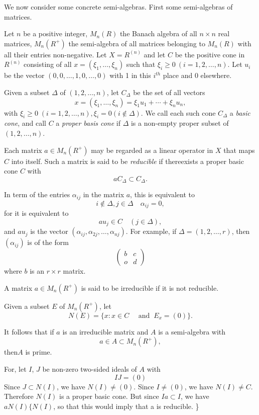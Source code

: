 We now consider some concrete semi-algebras. First some semi-algebras
of matrices. 

Let $n$ be a positive integer, $M_n (R)$ the Banach algebra of all $n
\times n$ real matrices, $M_n(R^+)$ the semi-algebra of all matrices
belonging to $M_n(R)$ with all their entries non-negative. Let $X =
R^{(n)}$ and let $C$ be the positive cone in $R^{(n)}$ consisting of
all $x = ( \xi_1 , \ldots, \xi_n)$ such that $\xi_i \geq 0~ (i = 1, 2,
\ldots, n)$. Let $u_i$ be the vector $(0, 0, \ldots, 1, 0, \ldots, 0)$
with 1 in this $i^{th}$ place and $0$ elsewhere. 

Given a subset $\Delta$ of $(1, 2, \ldots, n)$, let $C_\Delta$ be the
set of all vectors 
$$
x = (\xi_1, \ldots, \xi_n) = \xi_1 u_1 + \cdots + \xi_n u_n,
$$
with $\xi_i \geq 0 \; (i=1, 2, \ldots,n), \xi_i = 0(i \notin \Delta)$. We
call each such cone $C_\Delta$ a \textit{basic cone}, and call $C$ a
\textit{proper basis cone} if $\Delta$ is a non-empty proper subset of
$(1, 2, \ldots, n)$. 

Each matrix $a \in M_n (R^+)$ may be regarded as a linear operator in
$X$ that maps $C$ into itself. Such a matrix is said to be
\textit{reducible} if there\pageoriginale exists a proper basic cone
$C$ with  
$$
a C_\Delta \subset C_\Delta.
$$

In term of the entries $\alpha_{ij}$ in the matrix $a$, this is
equivalent to  
$$
i \notin  \Delta, j \in \Delta \quad \alpha_{ij} = 0,
$$
for it is equivalent to  
$$
au_j \in C \quad (j \in \Delta),
$$
and $au_j$ is the vector $(\alpha_{ij}, \alpha_{2j} , \ldots,
\alpha_{nj})$. For example, if $\Delta = (1, 2, \ldots, r)$, then
$(\alpha_{ij})$ is of the form 
$$
\begin{pmatrix}
  b & c \\ 
  o & d 
\end{pmatrix}
$$
where $b$ is an $r \times r$ matrix.

A matrix $a \in M_n (R^+)$ is said to be irreducible if it is not reducible.

Given a subset $E$ of $M_n (R^+)$, let
$$
N(E) = \{ x : x \in C \quad \text{ and }~ E_x = (0)\}.
$$

It follows that if $a$ is an irreducible matrix and $A$ is a
semi-algebra with 
$$
a \in A \subset M_n (R^+),
$$
then\pageoriginale $A$ is prime.

For, let $I$, $J$ be non-zero two-sided ideals of $A$ with
$$
I J = (0)
$$
Since $J \subset N(I)$, we have $N(I) \neq (0)$. Since $I \neq (0)$,
we have $N(I) \neq C$. Therefore $N(I)$ is a proper basic cone. But
since $I a \subset I$, we have $a N(I)\bigg\{ N(I)$, so that this
would imply that a is reducible. \bigg\}

